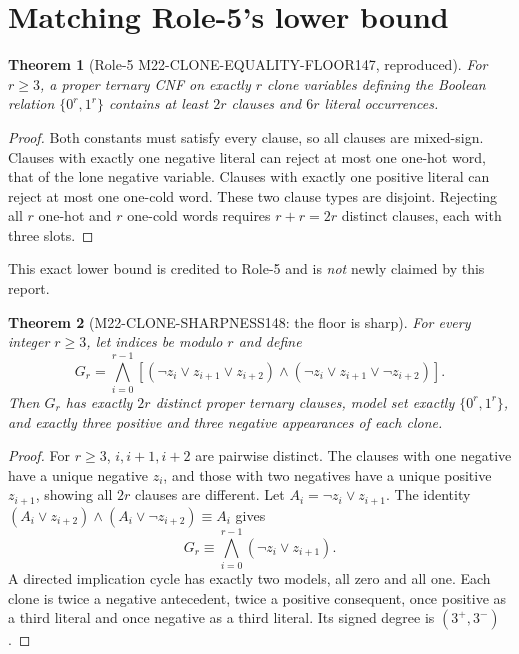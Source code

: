 \documentclass[11pt]{article}
\newtheorem{theorem}{Theorem}
\begin{document}
\section{Matching Role-5's lower bound}
\begin{theorem}[Role-5 M22-CLONE-EQUALITY-FLOOR147, reproduced]
For $r\ge3$, a proper ternary CNF on exactly $r$ clone variables defining the Boolean relation $\{0^r,1^r\}$ contains at least $2r$ clauses and $6r$ literal occurrences.
\end{theorem}
\begin{proof}
Both constants must satisfy every clause, so all clauses are mixed-sign. Clauses with exactly one negative literal can reject at most one one-hot word, that of the lone negative variable. Clauses with exactly one positive literal can reject at most one one-cold word. These two clause types are disjoint. Rejecting all $r$ one-hot and $r$ one-cold words requires $r+r=2r$ distinct clauses, each with three slots.
\end{proof}
This exact lower bound is credited to Role-5 and is \emph{not} newly claimed by this report.

\begin{theorem}[M22-CLONE-SHARPNESS148: the floor is sharp]
For every integer $r\ge3$, let indices be modulo $r$ and define
\[
G_r=\bigwedge_{i=0}^{r-1}
[(\neg z_i\vee z_{i+1}\vee z_{i+2})\wedge
 (\neg z_i\vee z_{i+1}\vee\neg z_{i+2})].
\tag{1}
\]
Then $G_r$ has exactly $2r$ distinct proper ternary clauses, model set exactly $\{0^r,1^r\}$, and exactly three positive and three negative appearances of each clone.
\end{theorem}
\begin{proof}
For $r\ge3$, $i,i+1,i+2$ are pairwise distinct. The clauses with one negative have a unique negative $z_i$, and those with two negatives have a unique positive $z_{i+1}$, showing all $2r$ clauses are different. Let $A_i=\neg z_i\vee z_{i+1}$. The identity $(A_i\vee z_{i+2})\wedge(A_i\vee\neg z_{i+2})\equiv A_i$ gives
\[
G_r\equiv\bigwedge_{i=0}^{r-1}(\neg z_i\vee z_{i+1}).
\tag{2}
\]
A directed implication cycle has exactly two models, all zero and all one. Each clone is twice a negative antecedent, twice a positive consequent, once positive as a third literal and once negative as a third literal. Its signed degree is $(3^+,3^-)$.
\end{proof}
\end{document}

